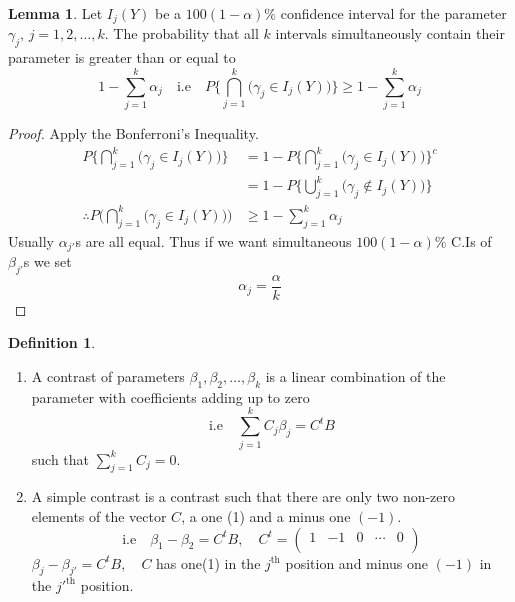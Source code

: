 \documentclass[11pt,a4paper]{article}
\theoremstyle{definition}
\newtheorem{defn}[thm]{Definition}
\newtheorem{lem}[thm]{Lemma}
\begin{document}
\begin{lem}\label{res:lem:2.3.2}
Let $I_j(Y)$ be a $100(1-\alpha)\%$ confidence interval for the parameter $\gamma_j,\, j=1,2,\ldots ,k$. The probability that all $k$ intervals simultaneously contain their parameter is greater than or equal to $$1-\sum^k_{j=1}\alpha_j\quad \text{i.e}\quad  P\Bigg\{\bigcap^k_{j=1}\Big(\gamma_j\in I_j(Y)\Big)\Bigg\}\geq 1-\sum^k_{j=1}\alpha_j$$
\end{lem}

\begin{proof}
Apply the Bonferroni's Inequality.
\begin{align*}
P\Big\{\bigcap^k_{j=1}\big(\gamma_j\in I_j(Y)\big)\Big\} & = 1- P\Big\{\bigcap^k_{j=1}\big(\gamma_j\in I_j(Y)\big)\Big\}^c\\
                                                         & = 1 -P\Big\{\bigcup^k_{j=1}\big(\gamma_j\not\in I_j(Y)\big)\Big\}\\
 \therefore P\Bigg(\bigcap^k_{j=1}\big(\gamma_j\in I_j(Y)\big)\Bigg) & \geq 1-\sum^k_{j=1}\alpha_j                                                        
\end{align*}
Usually $\alpha_{j'}$s are all equal. Thus if we want simultaneous $100(1-\alpha)\%$ C.Is of $\beta_{j'}$s we set $$\alpha_j=\frac{\alpha}{k}$$
\end{proof}


\begin{defn}\label{res:defn:2.3.3}
\begin{enumerate}
\item A contrast of parameters $\beta_1,\beta_2,\ldots ,\beta_k$ is a linear combination of the parameter with coefficients adding up to zero $$\text{i.e}\quad  \sum^k_{j=1}C_j\beta_j=C^tB$$ such that $\sum\limits^k_{j=1}C_j=0$.
\item A simple contrast is a contrast such that there are only two non-zero elements of the vector $C$, a one (1) and a minus one $(-1)$. $$\text{i.e}\quad  \beta_1-\beta_2=C^tB,\quad  C^t=
\begin{pmatrix}
1  & -1 & 0 & \cdots & 0\\
\end{pmatrix}
$$
$\beta_j-\beta_{j'}=C^tB,\quad  C$ has one(1) in the $j^{\text{th}}$ position and minus one $(-1)$ in the $j'^{\text{th}}$ position.\\
\end{enumerate}
\end{defn}
\end{document}
